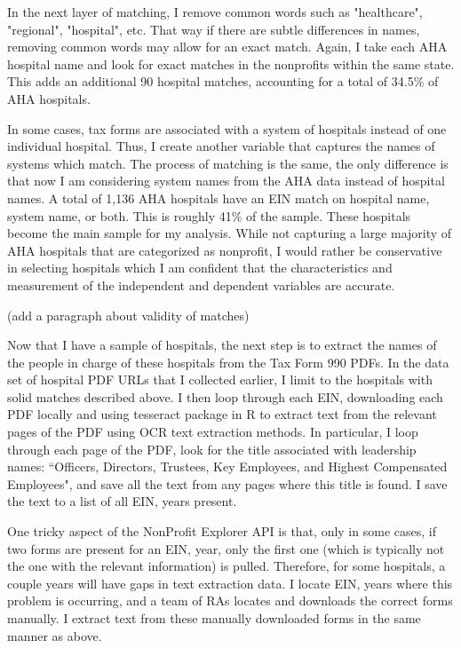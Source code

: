 \documentclass[12pt]{article}
\begin{document}
In the next layer of matching, I remove common words such as "healthcare", "regional", "hospital", etc. That way if there are subtle differences in names, removing common words may allow for an exact match. Again, I take each AHA hospital name and look for exact matches in the nonprofits within the same state. This adds an additional 90 hospital matches, accounting for a total of 34.5\% of AHA hospitals. 

In some cases, tax forms are associated with a system of hospitals instead of one individual hospital. Thus, I create another variable that captures the names of systems which match. The process of matching is the same, the only difference is that now I am considering system names from the AHA data instead of hospital names. A total of 1,136 AHA hospitals have an EIN match on hospital name, system name, or both. This is roughly 41\% of the sample. These hospitals become the main sample for my analysis. While not capturing a large majority of AHA hospitals that are categorized as nonprofit, I would rather be conservative in selecting hospitals which I am confident that the characteristics and measurement of the independent and dependent variables are accurate. 

(add a paragraph about validity of matches)

 Now that I have a sample of hospitals, the next step is to extract the names of the people in charge of these hospitals from the Tax Form 990 PDFs. In the data set of hospital PDF URLs that I collected earlier, I limit to the hospitals with solid matches described above. I then loop through each EIN, downloading each PDF locally and using tesseract package in R to extract text from the relevant pages of the PDF using OCR text extraction methods. In particular, I loop through each page of the PDF, look for the title associated with leadership names: ``Officers, Directors, Trustees, Key Employees, and Highest Compensated Employees", and save all the text from any pages where this title is found. I save the text to a list of all EIN, years present. 

One tricky aspect of the NonProfit Explorer API is that, only in some cases, if two forms are present for an EIN, year, only the first one (which is typically not the one with the relevant information) is pulled. Therefore, for some hospitals, a couple years will have gaps in text extraction data. I locate EIN, years where this problem is occurring, and a team of RAs locates and downloads the correct forms manually. I extract text from these manually downloaded forms in the same manner as above. 
\end{document}
